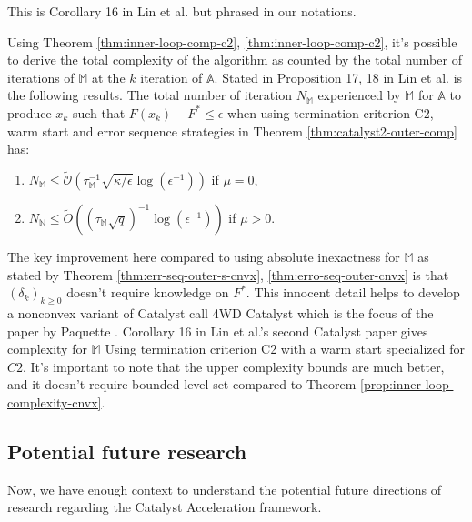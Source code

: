 \documentclass[12pt]{article}
\begin{document}
            \begin{remark}
                This is Corollary 16 in Lin et al. \cite{lin_catalyst_2018} but phrased in our notations. 
            \end{remark}
            Using Theorem \ref{thm:inner-loop-comp-c2}, \ref{thm:inner-loop-comp-c2}, it's possible to derive the total complexity of the algorithm as counted by the total number of iterations of $\mathbb M$ at the $k$ iteration of $\mathbb A$.
            Stated in Proposition 17, 18 in Lin et al. \cite{lin_catalyst_2018} is the following results.
            The total number of iteration $N_{\mathbb M}$ experienced by $\mathbb M$ for $\mathbb A$ to produce $x_k$ such that $F(x_k) - F^* \le \epsilon$ when using termination criterion C2, warm start and error sequence strategies in Theorem \ref{thm:catalyst2-outer-comp} has: 
            \begin{enumerate}
                \item $N_{\mathbb M} \le \widetilde{\mathcal O}\left(\tau_{\mathbb M}^{-1}\sqrt{\kappa/\epsilon}\log(\epsilon^{-1})\right)$ if $\mu = 0$, 
                \item $N_{\mathbb N}\le \widetilde{O}\left((\tau_{\mathbb M}\sqrt{q})^{-1}\log(\epsilon^{-1})\right)$ if $\mu > 0$. 
            \end{enumerate}
            \par
            The key improvement here compared to using absolute inexactness for $\mathbb M$ as stated by Theorem \ref{thm:err-seq-outer-s-cnvx}, \ref{thm:erro-seq-outer-cnvx} is that $(\delta_k)_{k \ge0}$ doesn't require knowledge on $F^*$. 
            This innocent detail helps to develop a nonconvex variant of Catalyst call 4WD Catalyst which is the focus of the paper by Paquette \cite{paquette_catalyst_2018}. 
            Corollary 16 in Lin et al.'s second Catalyst paper \cite{lin_catalyst_2018} gives complexity for $\mathbb M$ Using termination criterion C2 with a warm start specialized for $C2$. 
            It's important to note that the upper complexity bounds are much better, and it doesn't require bounded level set compared to Theorem \ref{prop:inner-loop-complexity-cnvx}.      
    \subsection{Potential future research}\label{ssec:catalyst-future}
        Now, we have enough context to understand the potential future directions of research regarding the Catalyst Acceleration framework. 
\end{document}

